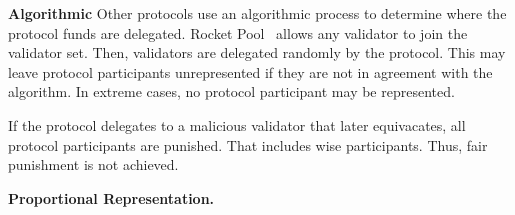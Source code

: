 

\textbf{Algorithmic}
Other protocols use an algorithmic process to determine
where the protocol funds are delegated. Rocket Pool~\cite{rocketpool} %
allows any validator to join the validator set. Then,
validators are delegated randomly by the protocol.
This may leave protocol participants unrepresented if they are not in
agreement with the algorithm. In extreme cases, no protocol participant may be
represented.

If the protocol delegates to a malicious validator that later equivacates,
all protocol participants are punished. That includes wise participants. Thus,
fair punishment is not achieved.


\textbf{Proportional Representation.}









